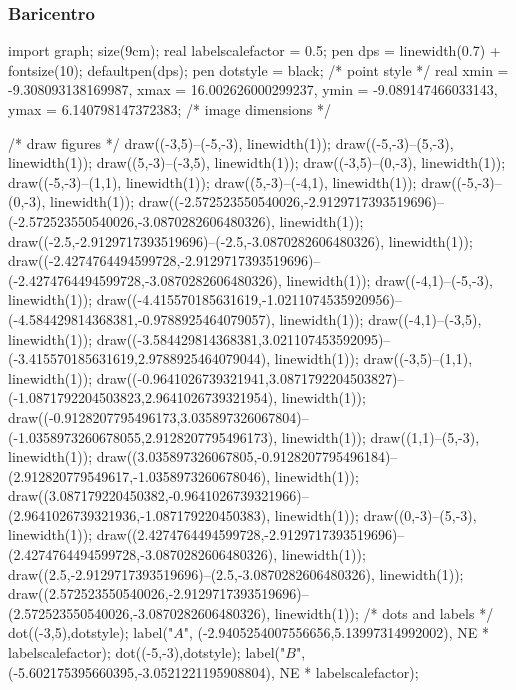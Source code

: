 \documentclass[11pt]{scrartcl}
\begin{document}
	\subsubsection{Baricentro}
	
	\begin{center}
		\begin{asy}
			import graph; size(9cm); 
			real labelscalefactor = 0.5;
			pen dps = linewidth(0.7) + fontsize(10); defaultpen(dps);
			pen dotstyle = black; /* point style */ 
			real xmin = -9.308093138169987, xmax = 16.002626000299237, ymin = -9.089147466033143, ymax = 6.140798147372383;  /* image dimensions */
			
			/* draw figures */
			draw((-3,5)--(-5,-3), linewidth(1)); 
			draw((-5,-3)--(5,-3), linewidth(1)); 
			draw((5,-3)--(-3,5), linewidth(1)); 
			draw((-3,5)--(0,-3), linewidth(1)); 
			draw((-5,-3)--(1,1), linewidth(1)); 
			draw((5,-3)--(-4,1), linewidth(1)); 
			draw((-5,-3)--(0,-3), linewidth(1)); 
			draw((-2.572523550540026,-2.9129717393519696)--(-2.572523550540026,-3.0870282606480326), linewidth(1)); 
			draw((-2.5,-2.9129717393519696)--(-2.5,-3.0870282606480326), linewidth(1)); 
			draw((-2.4274764494599728,-2.9129717393519696)--(-2.4274764494599728,-3.0870282606480326), linewidth(1)); 
			draw((-4,1)--(-5,-3), linewidth(1)); 
			draw((-4.415570185631619,-1.0211074535920956)--(-4.584429814368381,-0.9788925464079057), linewidth(1)); 
			draw((-4,1)--(-3,5), linewidth(1)); 
			draw((-3.584429814368381,3.021107453592095)--(-3.415570185631619,2.9788925464079044), linewidth(1)); 
			draw((-3,5)--(1,1), linewidth(1)); 
			draw((-0.9641026739321941,3.0871792204503827)--(-1.0871792204503823,2.9641026739321954), linewidth(1)); 
			draw((-0.9128207795496173,3.035897326067804)--(-1.0358973260678055,2.9128207795496173), linewidth(1)); 
			draw((1,1)--(5,-3), linewidth(1)); 
			draw((3.035897326067805,-0.9128207795496184)--(2.912820779549617,-1.0358973260678046), linewidth(1)); 
			draw((3.087179220450382,-0.9641026739321966)--(2.9641026739321936,-1.087179220450383), linewidth(1)); 
			draw((0,-3)--(5,-3), linewidth(1)); 
			draw((2.4274764494599728,-2.9129717393519696)--(2.4274764494599728,-3.0870282606480326), linewidth(1)); 
			draw((2.5,-2.9129717393519696)--(2.5,-3.0870282606480326), linewidth(1)); 
			draw((2.572523550540026,-2.9129717393519696)--(2.572523550540026,-3.0870282606480326), linewidth(1)); 
			/* dots and labels */
			dot((-3,5),dotstyle); 
			label("$A$", (-2.9405254007556656,5.13997314992002), NE * labelscalefactor); 
			dot((-5,-3),dotstyle); 
			label("$B$", (-5.602175395660395,-3.0521221195908804), NE * labelscalefactor); 

\end{asy}
\end{center}
\end{document}
